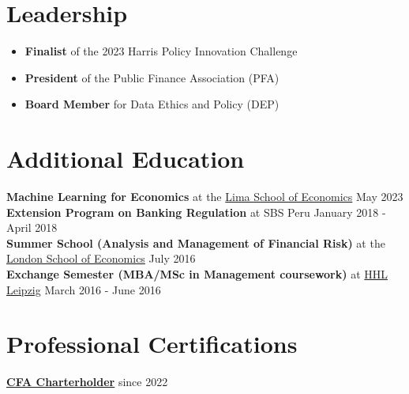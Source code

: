 \renewcommand{\subsection}[3]{
    \noindent\textbf{#1}  {#2} \hfill #3
}
\section{Leadership}

\vspace{-0.6cm}
\begin{itemize}
    \item \textbf{Finalist} of the 2023 Harris Policy Innovation Challenge
    \item \textbf{President} of the Public Finance Association (PFA)
    \item \textbf{Board Member} for Data Ethics and Policy (DEP)
\end{itemize}


\section{Additional Education}
\subsection{Machine Learning for Economics}{at the \href{https://limase.pe/summer-school-2023/}{Lima School of Economics}}{May 2023} \\
\subsection{Extension Program on Banking Regulation}{at SBS Peru}{January 2018 - April 2018} \\
\subsection{Summer School (Analysis and Management of Financial Risk)}{at the \href{https://www.lse.ac.uk/}{London School of Economics}}{July 2016} \\
\subsection{Exchange Semester (MBA/MSc in Management coursework)}{at \href{https://www.hhl.de/}{HHL Leipzig}}{March 2016 - June 2016} 

\section{Professional Certifications}
\href{https://directory.cfainstitute.org/profile/272E08C8D736165FB8BDFD7CEDAA3CBB1EDE5A5A?event=memberDirectoryProfileView}{\textbf{CFA Charterholder}} since 2022
